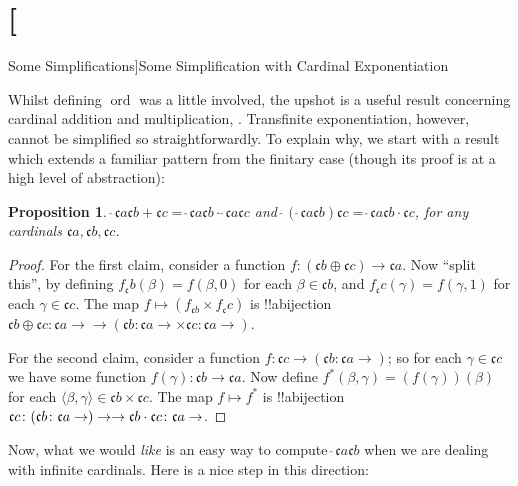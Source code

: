 \documentclass[10pt,a4paper]{article}
\makeatletter
\theoremstyle{plain}
\newtheorem{prop}[thm]{Proposition}
\theoremstyle{definition}
\theoremstyle{remark}
\newcommand*{\olfileid}[3]{}
\newcommand*{\olsection}[1]{\section*{#1}}
\newcommand*{\ollabel}[1]{\label{#1}}
\newcommand{\olref}{\@ifnextchar[{\olref@i}{\olref@final}}
\def\olref@i[#1]{\@ifnextchar[{\olref@ii}{\olref@final}}
\def\olref@ii[#1]{\@ifnextchar[{\olref@iii}{\olref@final}}
\def\olref@iii[#1]{\olref@final}
\def\olref@final#1{\ref{#1}}
\providecommand{\tuple}[1]{\langle #1 \rangle}
\providecommand{\cardplus}{\mathbin{+}}
\providecommand{\cardtimes}{\mathbin{\cdot}}
\providecommand{\cardexpo}{\mathbin{\hat{\ }}}
\providecommand{\funfromto}[3]{#1\colon #2 \to #3}
\providecommand{\canonord}{\operatorname{ord}}
\providecommand{\cardfont}{\mathfrak{c}}
\providecommand{\disjointsum}{\mathbin{\oplus}}
\providecommand{\cardplus}{\mathbin{+}}
\providecommand{\cardtimes}{\mathbin{\cdot}}
\providecommand{\cardexpo}{\mathbin{\hat{\ }}}
\makeatother
\begin{document}
\olfileid{sth}{card-arithmetic}{expotough}

\olsection[Some Simplifications]{Some Simplification with Cardinal Exponentiation}

Whilst defining $\canonord$ was a little involved, the upshot is a
useful result concerning cardinal addition and multiplication,
\olref[simp]{cardplustimesmax}. Transfinite exponentiation, however,
cannot be simplified so straightforwardly. To explain why, we start
with a result which extends a familiar pattern from the finitary case
(though its proof is at a high level of abstraction):

\begin{prop}\ollabel{simplecardexpo}
$\cardexpo{\cardfont{a}}{\cardfont{b} \cardplus \cardfont{c}} =
\cardexpo{\cardfont{a}}{\cardfont{b}} \cardtimes
\cardexpo{\cardfont{a}}{\cardfont{c}}$ and
$\cardexpo{(\cardexpo{\cardfont{a}}{\cardfont{b}})}{\cardfont{c}} =
\cardexpo{\cardfont{a}}{\cardfont{b} \cardtimes \cardfont{c}}$, for
any cardinals $\cardfont{a}, \cardfont{b}, \cardfont{c}$.
\end{prop}

\begin{proof}
For the first claim, consider a function $f \colon
(\cardfont{b}\disjointsum\cardfont{c}) \to \cardfont{a}$. Now ``split
this'', by defining $f_\cardfont{b}(\beta) = f(\beta, 0)$ for each
$\beta \in \cardfont{b}$, and $f_\cardfont{c}(\gamma) = f(\gamma, 1)$
for each $\gamma \in \cardfont{c}$. The map $f \mapsto
(f_{\cardfont{b}} \times f_\cardfont{c})$ is !!a{bijection}
$\funfromto{\cardfont{b} \disjointsum \cardfont{c}}{\cardfont{a}} \to
(\funfromto{\cardfont{b}}{\cardfont{a}} \times
\funfromto{\cardfont{c}}{\cardfont{a}})$. 

For the second claim, consider a function $f \colon \cardfont{c} \to
(\funfromto{\cardfont{b}}{\cardfont{a}})$; so for each $\gamma \in
\cardfont{c}$ we have some function $f(\gamma) \colon \cardfont{b} \to
\cardfont{a}$. Now define $f^*(\beta, \gamma) = (f(\gamma))(\beta)$
for each $\tuple{\beta, \gamma} \in \cardfont{b} \times \cardfont{c}$.
The map $f \mapsto f^*$ is !!a{bijection}
$\funfromto{\cardfont{c}}{(\funfromto{\cardfont{b}}{\cardfont{a}})}
\to \funfromto{\cardfont{b} \cardtimes \cardfont{c}}{\cardfont{a}}$. 
\end{proof}

Now, what we would \emph{like} is an easy way to compute
$\cardexpo{\cardfont{a}}{\cardfont{b}}$ when we are dealing with
infinite cardinals. Here is a nice step in this direction:
\end{document}
